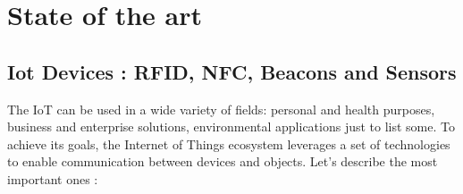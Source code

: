 \chead{}
\chapter{State of the art}

\section{Iot Devices : RFID, NFC, Beacons and Sensors}

The IoT can be used in a wide variety of fields: personal and health purposes, business and enterprise solutions, environmental applications just to list some. To achieve its goals, the Internet of Things ecosystem leverages a set of technologies to enable communication between devices and objects. Let's describe the most important ones :

